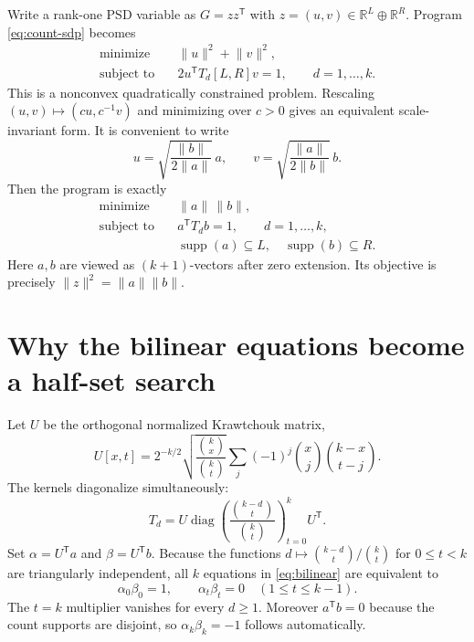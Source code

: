 \documentclass[11pt]{article}
\newcommand{\R}{\mathbb R}
\newcommand{\1}{\mathbf 1}
\newcommand{\norm}[1]{\lVert#1\rVert}
\newcommand{\diag}{\operatorname{diag}}
\begin{document}
Write a rank-one PSD variable as $G=zz^{\mathsf T}$ with
$z=(u,v)\in\R^L\oplus\R^R$.  Program \eqref{eq:count-sdp} becomes
\begin{equation}
 \begin{aligned}
 \text{minimize}\quad&\norm{u}^2+\norm{v}^2,\\
 \text{subject to}\quad&2u^{\mathsf T}T_d[L,R]v=1,
                         \qquad d=1,\ldots,k .
 \end{aligned}                                          \tag{R$_k$}\label{eq:rankone}
\end{equation}
This is a nonconvex quadratically constrained problem.  Rescaling
$(u,v)\mapsto(cu,c^{-1}v)$ and minimizing over $c>0$ gives an equivalent
scale-invariant form.  It is convenient to write
\begin{equation}
 u=\sqrt{\frac{\norm b}{2\norm a}}\,a,
 \qquad
 v=\sqrt{\frac{\norm a}{2\norm b}}\,b .               \label{eq:balance}
\end{equation}
Then the program is exactly
\begin{equation}
 \boxed{
 \begin{aligned}
 \text{minimize}\quad&\norm a\,\norm b,\\
 \text{subject to}\quad&a^{\mathsf T}T_d b=1,
                         \qquad d=1,\ldots,k,\\
 &\operatorname{supp}(a)\subseteq L,
 \quad \operatorname{supp}(b)\subseteq R.
 \end{aligned}}                                         \tag{B$_k$}\label{eq:bilinear}
\end{equation}
Here $a,b$ are viewed as $(k+1)$-vectors after zero extension.  Its objective
is precisely $\norm z^2=\norm a\norm b$.

\section{Why the bilinear equations become a half-set search}

Let $U$ be the orthogonal normalized Krawtchouk matrix,
\[
 U[x,t]=2^{-k/2}\sqrt{\frac{\binom{k}{x}}{\binom{k}{t}}}
 \sum_j(-1)^j\binom{x}{j}\binom{k-x}{t-j}.
\]
The kernels diagonalize simultaneously:
\begin{equation}
 T_d=U\diag\!\left(
 \frac{\binom{k-d}{t}}{\binom{k}{t}}
 \right)_{t=0}^kU^{\mathsf T}.                          \label{eq:diagonalization}
\end{equation}
Set $\alpha=U^{\mathsf T}a$ and $\beta=U^{\mathsf T}b$.  Because the
functions $d\mapsto\binom{k-d}{t}/\binom{k}{t}$ for $0\le t<k$ are
triangularly independent, all $k$ equations in \eqref{eq:bilinear} are
equivalent to
\begin{equation}
 \alpha_0\beta_0=1,\qquad
 \alpha_t\beta_t=0\quad(1\le t\le k-1).               \label{eq:complementarity}
\end{equation}
The $t=k$ multiplier vanishes for every $d\ge1$.  Moreover
$a^{\mathsf T}b=0$ because the count supports are disjoint, so
$\alpha_k\beta_k=-1$ follows automatically.
\end{document}
